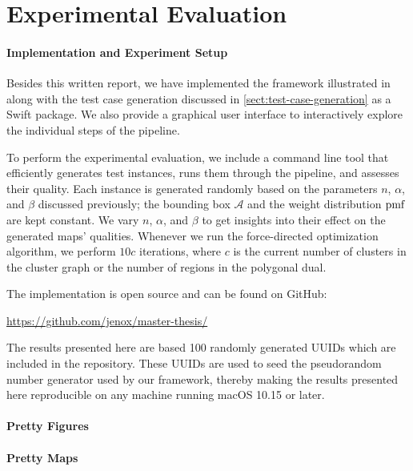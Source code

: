 \section{Experimental Evaluation}
\label{sect:experimental-evaluation}

\paragraph{Implementation and Experiment Setup}

Besides this written report, we have implemented the framework illustrated in 
 along with the test case generation discussed in \cref{sect:test-case-generation} as a Swift package.
We also provide a graphical user interface to interactively explore the individual steps of the pipeline.

To perform the experimental evaluation, we include a command line tool that efficiently generates test instances, runs them through the pipeline, and assesses their quality.
Each instance is generated randomly based on the parameters $n$, $\alpha$, and $\beta$ discussed previously; the bounding box $\mathcal{A}$ and the weight distribution $\operatorname{pmf}$ are kept constant.
We vary $n$, $\alpha$, and $\beta$ to get insights into their effect on the generated maps' qualities.
Whenever we run the force-directed optimization algorithm, we perform $10c$ iterations, where $c$ is the current number of clusters in the cluster graph or the number of regions in the polygonal dual.

The implementation is open source and can be found on GitHub:
%
\begin{center}
  \url{https://github.com/jenox/master-thesis/}
\end{center}

The results presented here are based 100 randomly generated UUIDs which are included in the repository.
These UUIDs are used to seed the pseudorandom number generator used by our framework, thereby making the results presented here reproducible on any machine running macOS 10.15 or later.



\paragraph{Pretty Figures}


\paragraph{Pretty Maps}
